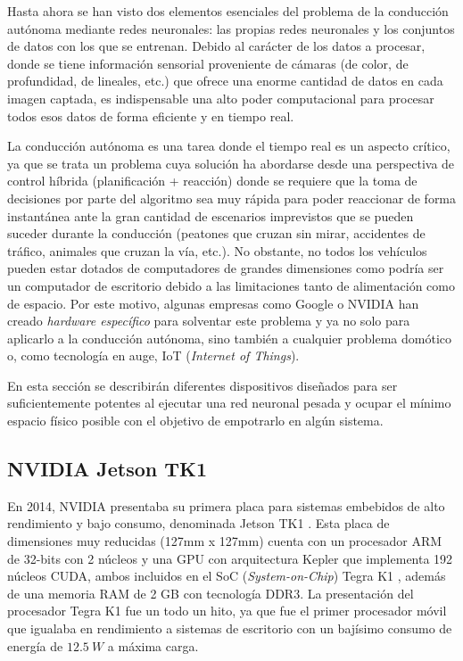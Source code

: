 Hasta ahora se han visto dos elementos esenciales del problema de la conducción autónoma mediante redes neuronales: las propias redes neuronales y los conjuntos de datos con los que se entrenan. Debido al carácter de los datos a procesar, donde se tiene información sensorial proveniente de cámaras (de color, de profundidad, de lineales, etc.) que ofrece una enorme cantidad de datos en cada imagen captada, es indispensable una alto poder computacional para procesar todos esos datos de forma eficiente y en tiempo real.

La conducción autónoma es una tarea donde el tiempo real es un aspecto crítico, ya que se trata un problema cuya solución ha abordarse desde una perspectiva de control híbrida (planificación + reacción) donde se requiere que la toma de decisiones por parte del algoritmo sea muy rápida para poder reaccionar de forma instantánea ante la gran cantidad de escenarios imprevistos que se pueden suceder durante la conducción (peatones que cruzan sin mirar, accidentes de tráfico, animales que cruzan la vía, etc.). No obstante, no todos los vehículos pueden estar dotados de computadores de grandes dimensiones como podría ser un computador de escritorio debido a las limitaciones tanto de alimentación como de espacio. Por este motivo, algunas empresas como Google o NVIDIA han creado \textit{hardware específico} para solventar este problema y ya no solo para aplicarlo a la conducción autónoma, sino también a cualquier problema domótico o, como tecnología en auge, IoT (\textit{Internet of Things}). 

En esta sección se describirán diferentes dispositivos diseñados para ser suficientemente potentes al ejecutar una red neuronal pesada y ocupar el mínimo espacio físico posible con el objetivo de empotrarlo en algún sistema.

\subsection{NVIDIA Jetson TK1}

En 2014, NVIDIA presentaba su primera placa para sistemas embebidos de alto rendimiento y bajo consumo, denominada Jetson TK1 \cite{jetsontk1}. Esta placa de dimensiones muy reducidas (127mm x 127mm) cuenta con un procesador ARM de 32-bits con 2 núcleos y una GPU con arquitectura Kepler que implementa 192 núcleos CUDA, ambos incluidos en el SoC (\textit{System-on-Chip}) Tegra K1 \cite{tegrak1}, además de una memoria RAM de 2 GB con tecnología DDR3. La presentación del procesador Tegra K1 fue un todo un hito, ya que fue el primer procesador móvil que igualaba en rendimiento a sistemas de escritorio con un bajísimo consumo de energía de $12.5\ W$ a máxima carga. 

